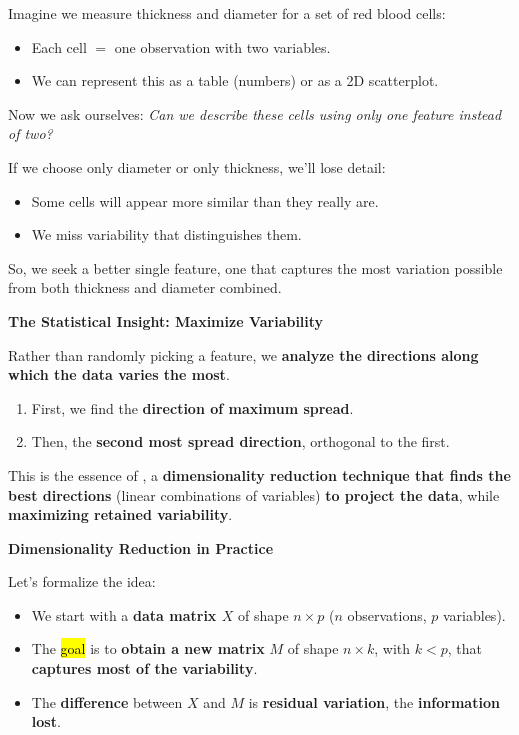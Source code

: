 \highspace
\begin{examplebox}
    Imagine we measure thickness and diameter for a set of red blood cells:
    \begin{itemize}
        \item Each cell $=$ one observation with two variables.
        \item We can represent this as a table (numbers) or as a 2D scatterplot.
    \end{itemize}
    Now we ask ourselves: \emph{Can we describe these cells using only one feature instead of two?}
    
    If we choose only diameter or only thickness, we'll lose detail:
    \begin{itemize}
        \item Some cells will appear more similar than they really are.
        \item We miss variability that distinguishes them.
    \end{itemize}
    So, we seek a better single feature, one that captures the most variation possible from both thickness and diameter combined.
\end{examplebox}

\highspace
\begin{flushleft}
    \textcolor{Green3}{ \textbf{The Statistical Insight: Maximize Variability}}
\end{flushleft}
Rather than randomly picking a feature, we \textbf{analyze the directions along which the data varies the most}.
\begin{enumerate}
    \item First, we find the \textbf{direction of maximum spread}.
    \item Then, the \textbf{second most spread direction}, orthogonal to the first.
\end{enumerate}
This is the essence of , a \textbf{dimensionality reduction technique that finds the best directions} (linear combinations of variables) \textbf{to project the data}, while \textbf{maximizing retained variability}.

\highspace
\begin{flushleft}
    \textcolor{Green3}{ \textbf{Dimensionality Reduction in Practice}}
\end{flushleft}
Let's formalize the idea:
\begin{itemize}
    \item We start with a \textbf{data matrix $X$} of shape $n \times p$ ($n$ observations, $p$ variables).
    \item The \hl{goal} is to \textbf{obtain a new matrix} $M$ of shape $n \times k$, with $k < p$, that \textbf{captures most of the variability}.
    \item The \textbf{difference} between $X$ and $M$ is \textbf{residual variation}, the \textbf{information lost}.
\end{itemize}

